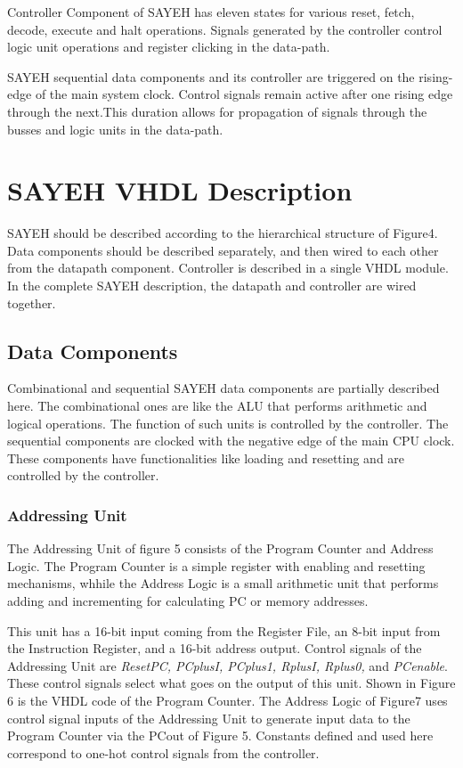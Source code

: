 \documentclass{report}
\begin{document}
    \par
        Controller Component of SAYEH has eleven states for various reset, fetch, decode, execute and halt operations. Signals generated by the controller control logic unit operations and register clicking in the data-path.
    \par
        SAYEH sequential data components and its controller are triggered on the rising-edge of the main system clock. Control signals remain active after one rising edge through the next.This duration allows for propagation of signals through the busses and logic units in the data-path.
        
        
\section{SAYEH VHDL Description}
        SAYEH should be described according to the hierarchical structure of Figure4. Data components should be described separately, and then wired to each other from the datapath component. Controller is described in a single VHDL module. In the complete SAYEH description, the datapath and controller are wired together.
    \subsection{Data Components}
        Combinational and sequential SAYEH data components are partially described here. The combinational ones are like the ALU that performs arithmetic and logical operations. The function of such units is controlled by the controller. The sequential components are clocked with the negative edge of the main CPU clock. These components have functionalities like loading and resetting and are controlled by the controller.
    \subsubsection{Addressing Unit}
        The Addressing Unit of figure 5 consists of the Program Counter and Address Logic. The Program Counter is a simple register with enabling and resetting mechanisms, whhile the Address Logic is a small arithmetic unit that performs adding and incrementing for calculating PC or memory addresses.
        \par
        This unit has a 16-bit input coming from the Register File, an 8-bit input from the Instruction Register, and a 16-bit address output. Control signals of the Addressing Unit are \textit{ResetPC, PCplusI, PCplus1, RplusI, Rplus0,} and \textit{PCenable}. These control signals select what goes on the output of this unit. Shown in Figure 6 is the VHDL code of the Program Counter. The Address Logic of Figure7 uses control signal inputs of the Addressing Unit to generate input data to the Program Counter via the PCout of Figure 5. Constants defined and used here correspond to one-hot control signals from the controller.
        
\end{document}

